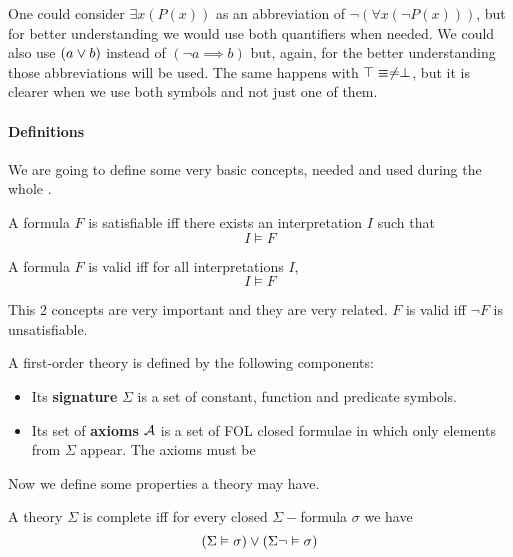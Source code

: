 One could consider $\exists x(P(x))$  as an abbreviation of $\neg (\forall x(\neg P(x)))$, but for better understanding we would use both quantifiers when needed.
We could also use $(a \vee b)$ instead of $(\neg a \implies b)$ but, again, for the better understanding those abbreviations will be used.
The same happens with $\top \equiv \neq \perp$, but it is clearer when we use both symbols and not just one of them.


\paragraph{Definitions}

We are going to define some very basic concepts, needed and used during the whole \thisworkm.

\begin{defn}[Satisfiability]

A formula $F$ is satisfiable \gls{iff} there exists an interpretation $I$ such that \[I \vDash F\]
\end{defn}

\begin{defn}[Validity]

A formula $F$ is valid \gls{iff} for all interpretations $I$, \[I\vDash F\]
\end{defn}
\label{def:validity}
This 2 concepts are very important and they are very related. $F$ is valid \gls{iff} $\neg F$ is unsatisfiable. 

\begin{defn}[Theory]

A first-order theory is defined by the following components: 
\begin{itemize}
	\item Its \textbf{signature} $\Sigma$ is a set of constant, function and predicate symbols.
	\item Its set of \textbf{axioms} $\mathcal{A}$ is a set of \gls{FOL} closed formulae in which only elements from $\Sigma$ appear.
	\subitem The axioms must be 
\end{itemize}
\end{defn}

Now we define some properties a theory may have.

\begin{defn}[Completeness]

	A theory $\Sigma$ is complete \gls{iff} for every closed $\Sigma-$formula $\sigma$ we have \[(\Sigma\vDash \sigma) \vee (\Sigma\neg\vDash \sigma) \] 
\end{defn}



